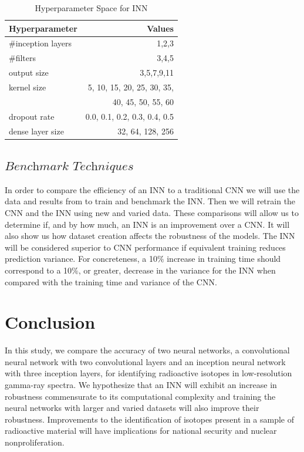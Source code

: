 \documentclass[fleqn]{anstrans}
\begin{document}
\begin{table}[ht]
\caption{Hyperparameter Space for INN}
\centering
\begin{tabular}{l r}
\hline\hline
Hyperparameter & {Values}\\
\hline
\#inception layers & {1,2,3}\\
\#filters & {3,4,5}\\
output size & {3,5,7,9,11}\\
kernel size & {5, 10, 15, 20, 25, 30, 35,}\\ 
			& {40, 45, 50, 55, 60}\\
dropout rate & {{0.0, 0.1, 0.2, 0.3, 0.4, 0.5}}\\ 
dense layer size & {32, 64, 128, 256}\\
\hline
\end{tabular}
\label{tab:hyper}
\end{table}

\subsection{$\textit{Benchmark Techniques}$}

In order to compare the efficiency of an INN to a traditional CNN we will use the data and results from \cite{kamudaMachineLearningApproach2018} to train and benchmark the INN. Then we will retrain the CNN and the INN using new and varied data. These comparisons will allow us to determine if, and by how much, an INN is an improvement over a CNN. It will also show us how dataset creation affects the robustness of the models.   
The INN will be considered superior to CNN performance if equivalent training reduces prediction variance. 
For concreteness, a 10$\%$ increase in training time should correspond to a 10$\%$, or greater, decrease in the variance for the INN when compared with the training time and variance of the CNN.

\section{Conclusion}

In this study, we compare the accuracy of two neural networks, a convolutional neural network with two convolutional layers and an inception neural network with three inception layers, for identifying radioactive isotopes in low-resolution gamma-ray spectra. 
We hypothesize that an INN will exhibit an increase in robustness commensurate to its computational complexity and training the neural networks with larger and varied datasets will also improve their robustness. 
Improvements to the identification of isotopes present in a sample of radioactive material will have implications for national security and nuclear nonproliferation.
\end{document}
